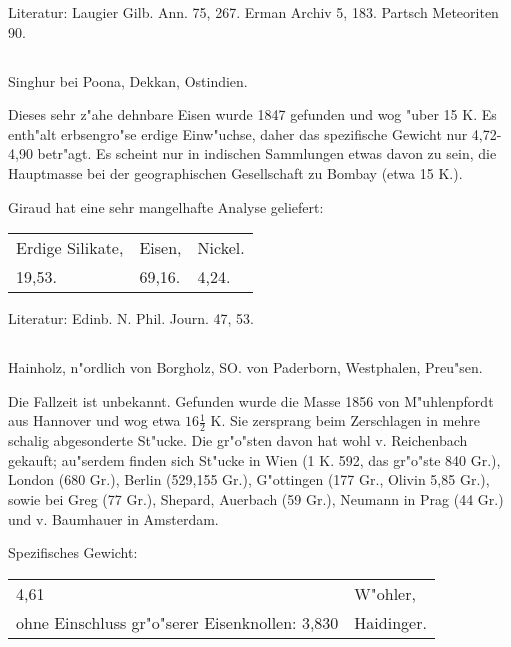 \documentclass[a4paper, 11pt, oneside]{article}
\begin{document}
\normalsize
Literatur: Laugier Gilb. Ann. 75, 267. Erman Archiv 5, 183. Partsch Meteoriten 90.

\subsection{}
\LARGE
\paragraph{}
Singhur bei Poona, Dekkan, Ostindien.

Dieses sehr z"ahe dehnbare Eisen wurde 1847 gefunden und wog "uber 15 K. Es enth"alt erbsengro"se erdige Einw"uchse, daher das spezifische Gewicht nur 4,72-4,90 betr"agt. Es scheint nur in indischen Sammlungen etwas davon zu sein, die Hauptmasse bei der geographischen Gesellschaft zu Bombay (etwa 15 K.).

Giraud hat eine sehr mangelhafte Analyse geliefert:
\begin{table}[H]
    \centering\swabfamily\Large
    \begin{tabular}{l l l}
        Erdige Silikate, & Eisen, & Nickel. \\
        19,53. & 69,16. & 4,24. \\
    \end{tabular}
\end{table}

\normalsize
Literatur: Edinb. N. Phil. Journ. 47, 53.

\subsection{}
\LARGE
\paragraph{}
Hainholz, n"ordlich von Borgholz, SO. von Paderborn, Westphalen, Preu"sen.

Die Fallzeit ist unbekannt. Gefunden wurde die Masse 1856 von M"uhlenpfordt aus Hannover und wog etwa $\mathfrak{16\frac{1}{2}}$ K. Sie zersprang beim Zerschlagen in mehre schalig abgesonderte St"ucke. Die gr"o"sten davon hat wohl v. Reichenbach gekauft; au"serdem finden sich St"ucke in Wien (1 K. 592, das gr"o"ste 840 Gr.), London (680 Gr.), Berlin (529,155 Gr.), G"ottingen (177 Gr., Olivin 5,85 Gr.), sowie bei Greg (77 Gr.), Shepard, Auerbach (59 Gr.), Neumann in Prag (44 Gr.) und v. Baumhauer in Amsterdam.

Spezifisches Gewicht: 
\begin{table}[!ht]
    \centering\swabfamily\Large
    \begin{tabular}{l l}
        4,61 & W"ohler,\\
        ohne Einschluss gr"o"serer Eisenknollen: 3,830 & Haidinger.
    \end{tabular}
\end{table}
\end{document}

